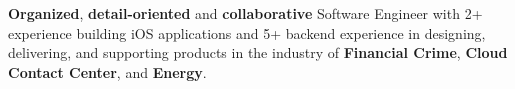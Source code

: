 
\begin{cvparagraph}
    \textbf{Organized}, \textbf{detail-oriented} and \textbf{collaborative} Software Engineer with 2+ experience building iOS applications and 5+ backend experience in designing, delivering, and supporting products in the industry of \textbf{Financial Crime}, \textbf{Cloud Contact Center}, and \textbf{Energy}.
\end{cvparagraph}




